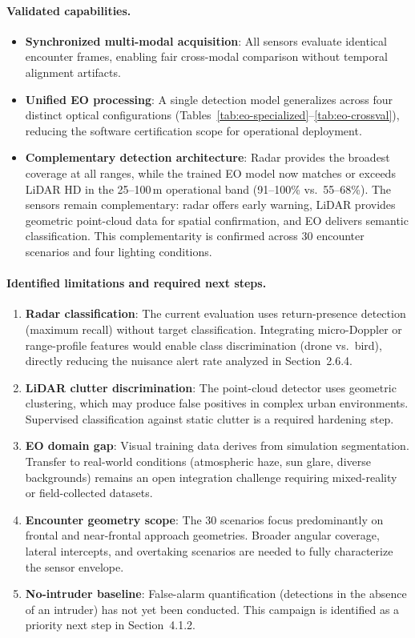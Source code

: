 \paragraph{Validated capabilities.}
\begin{itemize}
  \item \textbf{Synchronized multi-modal acquisition}: All sensors evaluate identical encounter frames, enabling fair cross-modal comparison without temporal alignment artifacts.
  \item \textbf{Unified EO processing}: A single detection model generalizes across four distinct optical configurations (Tables~\ref{tab:eo-specialized}--\ref{tab:eo-crossval}), reducing the software certification scope for operational deployment.
  \item \textbf{Complementary detection architecture}: Radar provides the broadest coverage at all ranges, while the trained EO model now matches or exceeds LiDAR HD in the 25--100\,m operational band (91--100\% vs.\ 55--68\%). The sensors remain complementary: radar offers early warning, LiDAR provides geometric point-cloud data for spatial confirmation, and EO delivers semantic classification. This complementarity is confirmed across 30 encounter scenarios and four lighting conditions.
\end{itemize}

\paragraph{Identified limitations and required next steps.}
\begin{enumerate}
  \item \textbf{Radar classification}: The current evaluation uses return-presence detection (maximum recall) without target classification. Integrating micro-Doppler or range-profile features would enable class discrimination (drone vs.\ bird), directly reducing the nuisance alert rate analyzed in Section~2.6.4.
  \item \textbf{LiDAR clutter discrimination}: The point-cloud detector uses geometric clustering, which may produce false positives in complex urban environments. Supervised classification against static clutter is a required hardening step.
  \item \textbf{EO domain gap}: Visual training data derives from simulation segmentation. Transfer to real-world conditions (atmospheric haze, sun glare, diverse backgrounds) remains an open integration challenge requiring mixed-reality or field-collected datasets.
  \item \textbf{Encounter geometry scope}: The 30 scenarios focus predominantly on frontal and near-frontal approach geometries. Broader angular coverage, lateral intercepts, and overtaking scenarios are needed to fully characterize the sensor envelope.
  \item \textbf{No-intruder baseline}: False-alarm quantification (detections in the absence of an intruder) has not yet been conducted. This campaign is identified as a priority next step in Section~4.1.2.
\end{enumerate}

